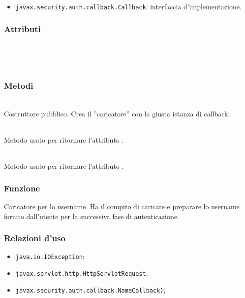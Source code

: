 \begin{itemize}
	\item \texttt{javax.security.auth.callback.Callback}: interfaccia d'implementazione.
\end{itemize}

\subsubsection*{Attributi}
\begin{description}
  \item{}\\
  \item{}\\
\end{description}

\subsubsection*{Metodi}
\begin{description}
	\item{}\\
	Costruttore pubblico. Crea il ''caricatore'' con la giusta istanza di callback.
	
	\item{}\\
	Metodo usato per ritornare l'attributo .
	
	\item{}\\
	Metodo usato per ritornare l'attributo .
	
\end{description}


\subsubsection*{Funzione}
Caricatore per lo username. Ha il compito di caricare e preparare lo username fornito dall'utente per la successiva fase di autenticazione.

\subsubsection*{Relazioni d'uso}
\begin{itemize}
	\item \texttt{java.io.IOException};
	\item \texttt{javax.servlet.http.HttpServletRequest};
	\item \texttt{javax.security.auth.callback.NameCallback)};
\end{itemize}

